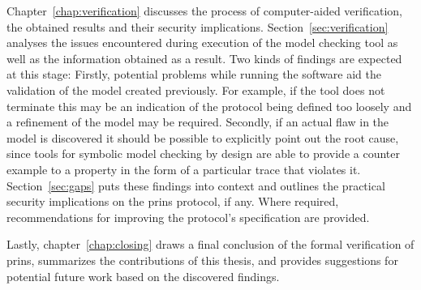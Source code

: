 Chapter~\ref{chap:verification} discusses the process of computer-aided verification, the obtained results and their security implications.
Section~\ref{sec:verification} analyses the issues encountered during execution of the model checking tool as well as the information obtained as a result.
Two kinds of findings are expected at this stage:
Firstly, potential problems while running the software aid the validation of the model created previously.
For example, if the tool does not terminate this may be an indication of the protocol being defined too loosely and a refinement of the model may be required.
Secondly, if an actual flaw in the model is discovered it should be possible to explicitly point out the root cause, since tools for symbolic model checking by design are able to provide a counter example to a property in the form of a particular trace that violates it.
Section~\ref{sec:gaps} puts these findings into context and outlines the practical security implications on the \gls{prins} protocol, if any.
Where required, recommendations for improving the protocol's specification are provided.

Lastly, chapter~\ref{chap:closing} draws a final conclusion of the formal verification of \gls{prins}, summarizes the contributions of this thesis, and provides suggestions for potential future work based on the discovered findings.
